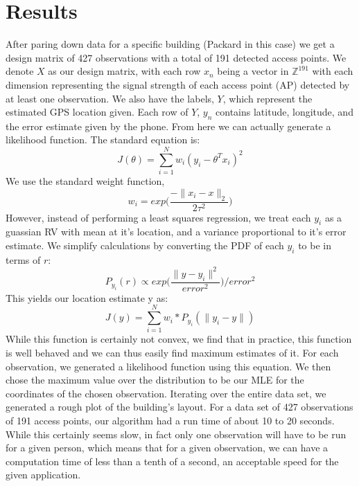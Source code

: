 \section{Results}
After paring down data for a specific building (Packard in this case)
we get a design matrix of 427 observations with a total of 191 detected
access points. We denote $X$ as our design matrix, with each row 
$x_n$ being a vector in $\mathbb{Z}^191$ with each dimension representing
the signal strength of each access point (AP) detected by at least 
one observation.  We also have the labels, $Y$, which represent the 
estimated GPS location given. Each row of $Y$, $y_n$ contains latitude,
longitude, and the error estimate given by the phone.  From here we can actually
generate a likelihood function. The standard equation is:
\begin{equation}
    J(\theta)= \sum_{i=1}^{N} w_i(y_i - \theta^T x_i)^2
\end{equation}
We use the standard weight function, 
\begin{equation} 
    w_i = exp \Bigg( \frac {-\| x_i - x \|_2} {2 \tau^2} \Bigg)
\end{equation}
However, instead of performing a least squares regression, 
we treat each $y_i$ as a guassian RV with mean at it's location, and 
a variance proportional to it's error estimate. We simplify calculations
by converting the PDF of each $y_i$ to be in terms of $r$:
\begin{equation} 
    P_{y_i}(r) \propto exp \Bigg( \frac{\| y - y_i \|^2} {error^2} \Bigg) / error^2
\end{equation}
This yields our location estimate y as:
\begin{equation}
    J(y)= \sum_{i=1}^{N} w_i * P_{y_i}(\|y_i - y\|)
\end{equation}
While this function is certainly not convex, we find that in practice, this 
function is well behaved and we can thus easily find maximum estimates of it.
For each observation, we generated a likelihood function using this equation.
We then chose the maximum value over the
distribution to be our MLE for the coordinates of the chosen
observation. Iterating over the entire data set, we generated a rough
plot of the building's layout.
For a data set of 427 observations of 191 access points, our algorithm
had a run time of about 10 to 20 seconds. While this certainly seems slow,
in fact only one observation will have to be run for a given person, which 
means that for a given observation, we can have a computation time of less than a
tenth of a second, an acceptable speed for the given application.
